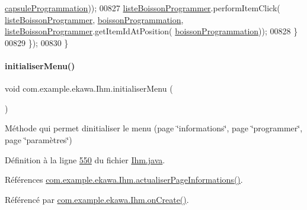 \begin{DoxyCode}
      \hyperlink{classcom_1_1example_1_1ekawa_1_1_ihm_a2ddf5b95e2a3fbb3a15d160ba266295a}{capsuleProgrammation}));
00827                 \hyperlink{classcom_1_1example_1_1ekawa_1_1_ihm_a8badf9f0485d205f8a379e54b01deab7}{listeBoissonProgrammer}.performItemClick(
      \hyperlink{classcom_1_1example_1_1ekawa_1_1_ihm_a8badf9f0485d205f8a379e54b01deab7}{listeBoissonProgrammer}, \hyperlink{classcom_1_1example_1_1ekawa_1_1_ihm_a6ad8136ec35fff9e96476c4f35726fea}{boissonProgrammation}, 
      \hyperlink{classcom_1_1example_1_1ekawa_1_1_ihm_a8badf9f0485d205f8a379e54b01deab7}{listeBoissonProgrammer}.getItemIdAtPosition(
      \hyperlink{classcom_1_1example_1_1ekawa_1_1_ihm_a6ad8136ec35fff9e96476c4f35726fea}{boissonProgrammation}));
00828             \}
00829         \});
00830     \}
\end{DoxyCode}
\mbox{\label{classcom_1_1example_1_1ekawa_1_1_ihm_a60968cecc69df879805b531a5f2ae19c}} 
\paragraph{\texorpdfstring{initialiser\+Menu()}{initialiserMenu()}}
{\footnotesize\ttfamily void com.\+example.\+ekawa.\+Ihm.\+initialiser\+Menu (\begin{DoxyParamCaption}{ }\end{DoxyParamCaption})\hspace{0.3cm}{\ttfamily [private]}}



Méthode qui permet d\textquotesingle{}initialiser le menu (page \char`\"{}informations\char`\"{}, page \char`\"{}programmer\char`\"{}, page \char`\"{}paramètres\char`\"{}) 



Définition à la ligne \hyperlink{_ihm_8java_source_l00550}{550} du fichier \hyperlink{_ihm_8java_source}{Ihm.\+java}.



Références \hyperlink{_ihm_8java_source_l00919}{com.\+example.\+ekawa.\+Ihm.\+actualiser\+Page\+Informations()}.



Référencé par \hyperlink{_ihm_8java_source_l00248}{com.\+example.\+ekawa.\+Ihm.\+on\+Create()}.


